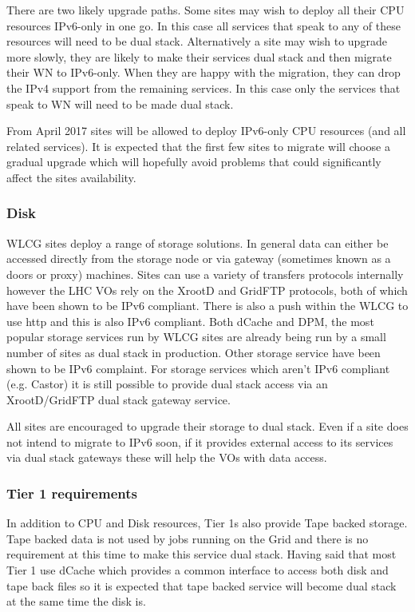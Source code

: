 \documentclass[11pt]{article}
\begin{document}
There are two likely upgrade paths.  Some sites may wish to deploy all their CPU resources IPv6-only in one go.  In this case all services that speak to any of these resources will need to be dual stack.  Alternatively a site may wish to upgrade more slowly, they are likely to make their services dual stack and then migrate their WN to IPv6-only.  When they are happy with the migration, they can drop the IPv4 support from the remaining services.  In this case only the services that speak to WN will need to be made dual stack.  

From April 2017 sites will be allowed to deploy IPv6-only CPU resources (and all related services). It is expected that the first few sites to migrate will choose a gradual upgrade which will hopefully avoid problems that could significantly affect the sites availability.


\subsubsection{Disk}
WLCG sites deploy a range of storage solutions.  In general data can either be accessed directly from the storage node or via gateway (sometimes known as a doors or proxy) machines.  Sites can use a variety of transfers protocols internally however the LHC VOs rely on the XrootD and GridFTP protocols, both of which have been shown to be IPv6 compliant.  There is also a push within the WLCG to use http and this is also IPv6 compliant.  Both dCache and DPM, the most popular storage services run by WLCG sites are already being run by a small number of sites as dual stack in production.  Other storage service have been shown to be IPv6 complaint.  For storage services which aren't IPv6 compliant (e.g. Castor) it is still possible to provide dual stack access via an XrootD/GridFTP dual stack gateway service.

All sites are encouraged to upgrade their storage to dual stack.  Even if a site does not intend to migrate to IPv6 soon, if it provides external access to its services via dual stack gateways these will help the VOs with data access.

\subsubsection{Tier 1 requirements}
In addition to CPU and Disk resources, Tier 1s also provide Tape backed storage.  Tape backed data is not used by jobs running on the Grid and there is no requirement at this time to make this service dual stack.  Having said that most Tier 1 use dCache which provides a common interface to access both disk and tape back files so it is expected that tape backed service will become dual stack at the same time the disk is.
\end{document}
